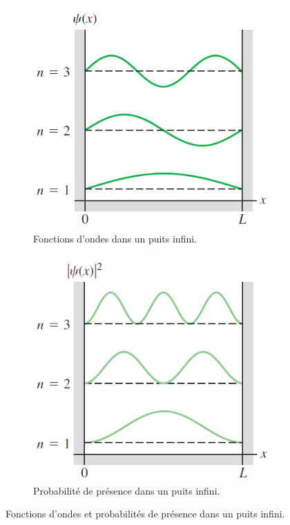 \begin{figure}[ht]
	\centering
	\begin{subfigure}[b]{0.45\textwidth}
		\centering
		\includegraphics[scale=0.4]{img/puits_infini_1.png}
		\caption{Fonctions d'ondes dans un puits infini.}
		\label{fig:fct-onde-puits-inf}
	\end{subfigure}
	\begin{subfigure}[b]{0.45\textwidth}
		\centering
		\includegraphics[scale=0.4]{img/puits_infini_2.png}
		\caption{Probabilité de présence dans un puits infini.}
		\label{fig:prob-puits-inf}
	\end{subfigure}
	\caption{Fonctions d'ondes et probabilités de présence
	dans un puits infini.}
\end{figure}

